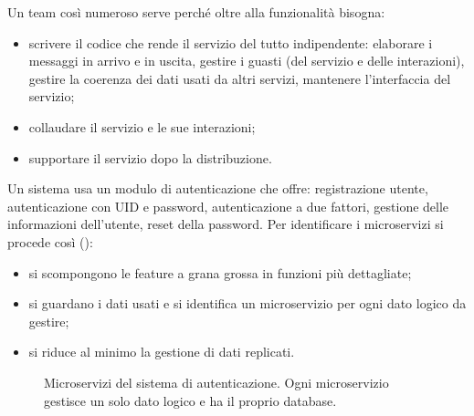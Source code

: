 Un team così numeroso serve perché oltre alla funzionalità bisogna:
\begin{itemize}
  \item scrivere il codice che rende il servizio del tutto indipendente: elaborare i messaggi in arrivo e in uscita,
    gestire i guasti (del servizio e delle interazioni), gestire la coerenza dei dati usati da altri servizi, mantenere
    l'interfaccia del servizio;
  \item collaudare il servizio e le sue interazioni;
  \item supportare il servizio dopo la distribuzione.
\end{itemize}

\begin{esempio}
Un sistema usa un modulo di autenticazione che offre: registrazione utente, autenticazione con UID e password,
autenticazione a due fattori, gestione delle informazioni dell'utente, reset della password. Per identificare i
microservizi si procede così ():
\begin{itemize}
  \item si scompongono le feature a grana grossa in funzioni più dettagliate;
  \item si guardano i dati usati e si identifica un microservizio per ogni dato logico da gestire;
  \item si riduce al minimo la gestione di dati replicati.
\end{itemize}
\end{esempio}

\begin{figure}[ht]
\centering
{}
\caption{Microservizi del sistema di autenticazione. Ogni microservizio gestisce un solo dato logico e ha il proprio
database.}
\label{fig:micro-auth}
\end{figure}

